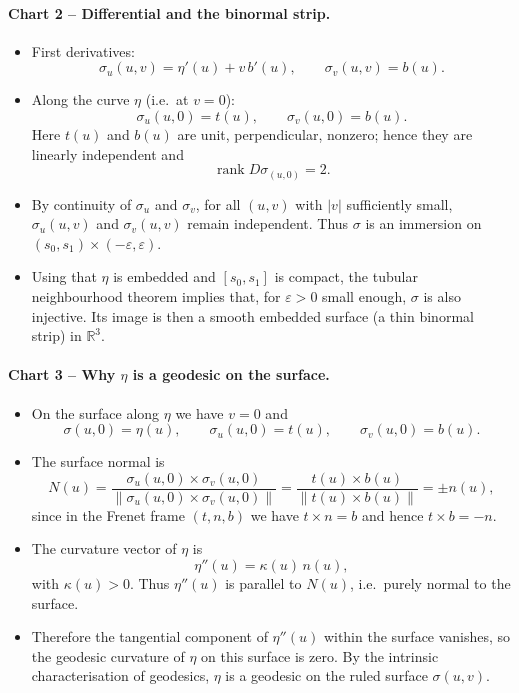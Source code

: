 \documentclass[12pt,a4paper]{article}
\theoremstyle{plain}
\theoremstyle{definition}      %
\begin{document}
	\paragraph{Chart 2 – Differential and the binormal strip.}
	\begin{itemize}
		\item First derivatives:
		\[
		\sigma_u(u,v)=\eta'(u)+v\,b'(u),\qquad
		\sigma_v(u,v)=b(u).
		\]
		\item Along the curve $\eta$ (i.e.\ at $v=0$):
		\[
		\sigma_u(u,0)=t(u),\qquad \sigma_v(u,0)=b(u).
		\]
		Here $t(u)$ and $b(u)$ are unit, perpendicular, nonzero; hence they are
		linearly independent and
		\[
		\operatorname{rank}D\sigma_{(u,0)}=2.
		\]
		\item By continuity of $\sigma_u$ and $\sigma_v$, for all $(u,v)$ with
		$|v|$ sufficiently small, $\sigma_u(u,v)$ and $\sigma_v(u,v)$ remain
		independent.  Thus $\sigma$ is an immersion on
		$(s_0,s_1)\times(-\varepsilon,\varepsilon)$.
		\item Using that $\eta$ is embedded and $[s_0,s_1]$ is compact, the tubular
		neighbourhood theorem implies that, for $\varepsilon>0$ small enough,
		$\sigma$ is also injective.  Its image is then a smooth embedded surface
		(a thin binormal strip) in $\mathbb{R}^3$.
	\end{itemize}
	
	\paragraph{Chart 3 – Why $\eta$ is a geodesic on the surface.}
	\begin{itemize}
		\item On the surface along $\eta$ we have $v=0$ and
		\[
		\sigma(u,0)=\eta(u),\qquad
		\sigma_u(u,0)=t(u),\qquad
		\sigma_v(u,0)=b(u).
		\]
		\item The surface normal is
		\[
		N(u)
		= \frac{\sigma_u(u,0)\times\sigma_v(u,0)}
		{\|\sigma_u(u,0)\times\sigma_v(u,0)\|}
		= \frac{t(u)\times b(u)}{\|t(u)\times b(u)\|}
		= \pm n(u),
		\]
		since in the Frenet frame $(t,n,b)$ we have $t\times n=b$ and hence
		$t\times b=-n$.
		\item The curvature vector of $\eta$ is
		\[
		\eta''(u)=\kappa(u)\,n(u),
		\]
		with $\kappa(u)>0$.  Thus $\eta''(u)$ is parallel to $N(u)$, i.e.\ purely
		normal to the surface.
		\item Therefore the tangential component of $\eta''(u)$ within the surface
		vanishes, so the geodesic curvature of $\eta$ on this surface is zero.
		By the intrinsic characterisation of geodesics, $\eta$ is a geodesic on
		the ruled surface $\sigma(u,v)$.
	\end{itemize}
	
\end{document}
